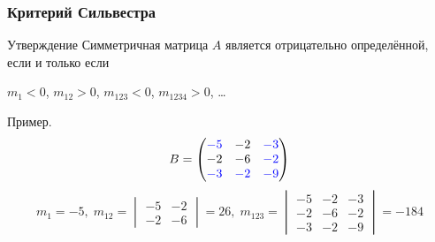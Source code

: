 \begin{frame}
\frametitle{Критерий Сильвестра}

\begin{block}{Утверждение}
    Симметричная матрица $A$ является отрицательно определённой, если и только если

    $m_1 < 0$, $m_{12} > 0$, $m_{123} < 0$, $m_{1234}>0$, \ldots   \pause   
\end{block}

Пример. 
\[
B = \begin{pmatrix}
    \textcolor{blue}{-5} & -2 & \textcolor{blue}{-3}  \\
    -2 & -6 & \textcolor{blue}{-2} \\
    \textcolor{blue}{-3} & \textcolor{blue}{-2} & \textcolor{blue}{-9} \\
\end{pmatrix}
\]
\[
    m_1 = -5, \; m_{12} = \begin{vmatrix}
        -5 & -2 \\
        -2 & -6
    \end{vmatrix} = 26, \; 
    m_{123} = \begin{vmatrix}
        -5 & -2 & -3 \\
        -2 & -6 & -2 \\
        -3 & -2 & -9
    \end{vmatrix}=  -184
\]



\end{frame}


